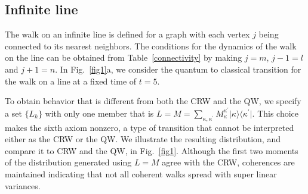 \documentclass[11pt,oneside,final]{huthesis}%
\begin{document}

\subsection{Infinite line}
The walk on an infinite line is defined for a graph with each vertex $j$ being
connected to its nearest neighbors. The conditions for the dynamics of the walk on
the line can be obtained from Table~\ref{connectivity} by making
$j=m$, $j-1=l$ and $j+1=n$. In Fig.~\ref{fig1}a, we consider the quantum to classical transition for the walk on a line at a fixed time of $t=5$.  

To obtain behavior that is different from
both the CRW and the QW, we specify a set $\{L_k\}$ with only one
member that is
$L=M=\sum_{\kappa,\kappa^\prime}M_\kappa^{\kappa^\prime}\vert \kappa
\rangle\langle \kappa^\prime\vert$. This choice makes the sixth axiom 
nonzero, a type of transition that cannot be interpreted either as the
CRW or the QW.  We illustrate the resulting distribution, and compare it to 
CRW and the QW, in Fig.~\ref{fig1}. Although the first two moments of the
distribution generated using $L=M$ agree with the CRW, coherences are
maintained indicating that not all coherent walks spread with super linear
variances.
\end{document}
